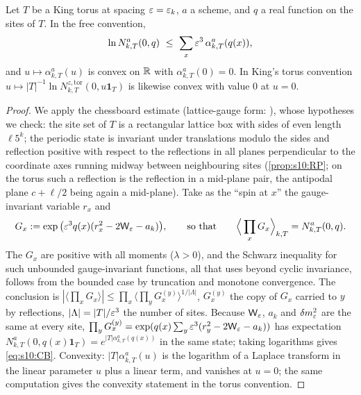 \begin{lemma}\label{lem:s10:CB}
Let $T$ be a King torus at spacing $\varepsilon=\varepsilon_k$, $a$ a scheme, and $q$ a real function on the sites of $T$. In the free convention,
\begin{equation}\label{eq:s10:CB}
\ln N^a_{k,T}(0,q)\ \le\ \sum_{x}\varepsilon^3\,\alpha^a_{k,T}(q(x)),
\end{equation}
and $u\mapsto\alpha^a_{k,T}(u)$ is convex on $\mathbb R$ with $\alpha^a_{k,T}(0)=0$. In King's torus convention $u\mapsto|T|^{-1}\ln N^{z,\mathrm{tor}}_{k,T}(0,u\mathbf 1_T)$ is likewise convex with value $0$ at $u=0$.
\end{lemma}

\begin{proof}
We apply the chessboard estimate \cite[Thm.~4.2]{FILS78} (lattice-gauge form: \cite[Thm.~2.10]{BFS1}), whose hypotheses we check: the site set of $T$ is a rectangular lattice box with sides of even length $\ell5^k$; the periodic state is invariant under translations modulo the sides and reflection positive with respect to the reflections in all planes perpendicular to the coordinate axes running midway between neighbouring sites (\cref{prop:s10:RP}; on the torus such a reflection is the reflection in a mid-plane pair, the antipodal plane $c+\ell/2$ being again a mid-plane). Take as the ``spin at $x$'' the gauge-invariant variable $r_x$ and
\[
G_x:=\exp\big(\varepsilon^3q(x)(r_x^2-2\mathsf W_{\varepsilon}-a_k)\big),\qquad\text{so that}\qquad\Big\langle\prod_xG_x\Big\rangle_{k,T}=N^a_{k,T}(0,q).
\]
The $G_x$ are positive with all moments ($\lambda>0$), and the Schwarz inequality for such unbounded gauge-invariant functions, all that \cite[Thm.~4.1]{FILS78} uses beyond cyclic invariance, follows from the bounded case by truncation and monotone convergence. The conclusion is $|\langle\prod_xG_x\rangle|\le\prod_x\langle\prod_yG_x^{(y)}\rangle^{1/|\Lambda|}$, $G_x^{(y)}$ the copy of $G_x$ carried to $y$ by reflections, $|\Lambda|=|T|/\varepsilon^3$ the number of sites. Because $\mathsf W_{\varepsilon}$, $a_k$ and $\delta m^2_{\varepsilon}$ are the same at every site, $\prod_yG_x^{(y)}=\exp(q(x)\sum_y\varepsilon^3(r_y^2-2\mathsf W_{\varepsilon}-a_k))$ has expectation $N^a_{k,T}(0,q(x)\mathbf 1_T)=e^{|T|\alpha^a_{k,T}(q(x))}$ in the same state; taking logarithms gives \eqref{eq:s10:CB}. Convexity: $|T|\alpha^a_{k,T}(u)$ is the logarithm of a Laplace transform in the linear parameter $u$ plus a linear term, and vanishes at $u=0$; the same computation gives the convexity statement in the torus convention.
\end{proof}

